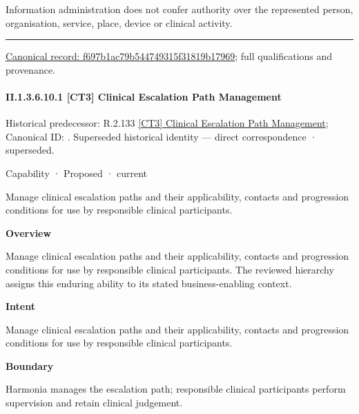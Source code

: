 Information administration does not confer authority over the represented person, organisation, service, place, device or clinical activity.



\medskip\hrule\medskip

{\footnotesize \href{../../../../../../../continuum/strategy/capability/f697b1ac79b544749315f31819b17969.md}{Canonical record: f697b1ac79b544749315f31819b17969}; full qualifications and provenance.}\par
\paragraph*{II.1.3.6.10.1 [CT3] Clinical Escalation Path Management}
\label{navigation:II.1.3.6.10.1}

{\small Historical predecessor: R.2.133 \hyperref[element:759a2e52172345e8ad1bc96d7e5ddad3]{[CT3] Clinical Escalation Path Management}; Canonical ID: \texttt{}. Superseded historical identity — direct correspondence · superseded.}\par
\label{element:cca86a32ba8c4dda84caeaa248e9f444}
{\small Capability · Proposed · current}\par

Manage clinical escalation paths and their applicability, contacts and progression conditions for use by responsible clinical participants.



\textbf{Overview}



Manage clinical escalation paths and their applicability, contacts and progression conditions for use by responsible clinical participants. The reviewed hierarchy assigns this enduring ability to its stated business-enabling context.



\textbf{Intent}



Manage clinical escalation paths and their applicability, contacts and progression conditions for use by responsible clinical participants.



\textbf{Boundary}



Harmonia manages the escalation path; responsible clinical participants perform supervision and retain clinical judgement.


